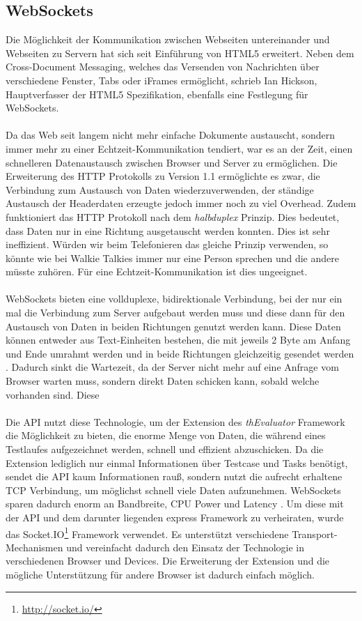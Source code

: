 \subsection{WebSockets}

Die Möglichkeit der Kommunikation zwischen Webseiten untereinander und Webseiten zu Servern hat sich seit Einführung von HTML5 erweitert. Neben dem Cross-Document Messaging, welches das Versenden von Nachrichten über verschiedene Fenster, Tabs oder iFrames ermöglicht, schrieb Ian Hickson, Hauptverfasser der HTML5 Spezifikation, ebenfalls eine Festlegung für WebSockets.\\
\\
Da das Web seit langem nicht mehr einfache Dokumente austauscht, sondern immer mehr zu einer Echtzeit-Kommunikation tendiert, war es an der Zeit, einen schnelleren Datenaustausch zwischen Browser und Server zu ermöglichen. Die Erweiterung des HTTP Protokolls zu Version 1.1 ermöglichte es zwar, die Verbindung zum Austausch von Daten wiederzuverwenden, der ständige Austausch der Headerdaten erzeugte jedoch immer noch zu viel Overhead. Zudem funktioniert das HTTP Protokoll nach dem \textit{halbduplex} Prinzip. Dies bedeutet, dass Daten nur in eine Richtung ausgetauscht werden konnten. Dies ist sehr ineffizient. Würden wir beim Telefonieren das gleiche Prinzip verwenden, so könnte wie bei Walkie Talkies immer nur eine Person sprechen und die andere müsste zuhören. Für eine Echtzeit-Kommunikation ist dies ungeeignet.\\
\\
WebSockets bieten eine vollduplexe, bidirektionale Verbindung, bei der nur ein mal die Verbindung zum Server aufgebaut werden muss und diese dann für den Austausch von Daten in beiden Richtungen genutzt werden kann. Diese Daten können entweder aus Text-Einheiten bestehen, die mit jeweils 2 Byte am Anfang und Ende umrahmt werden und in beide Richtungen gleichzeitig gesendet werden \cite{socketsbirectional}. Dadurch sinkt die Wartezeit, da der Server nicht mehr auf eine Anfrage vom Browser warten muss, sondern direkt Daten schicken kann, sobald welche vorhanden sind. Diese \\
\\
Die API nutzt diese Technologie, um der Extension des \textit{thEvaluator} Framework die Möglichkeit zu bieten, die enorme Menge von Daten, die während eines Testlaufes aufgezeichnet werden, schnell und effizient abzuschicken. Da die Extension lediglich nur einmal Informationen über Testcase und Tasks benötigt, sendet die API kaum Informationen rauß, sondern nutzt die aufrecht erhaltene TCP Verbindung, um möglichst schnell viele Daten aufzunehmen. WebSockets sparen dadurch enorm an Bandbreite, CPU Power und Latency \cite{websockets}. Um diese mit der API und dem darunter liegenden express Framework zu verheiraten, wurde das Socket.IO\footnote{\url{http://socket.io/}} Framework verwendet. Es unterstützt verschiedene Transport-Mechanismen und vereinfacht dadurch den Einsatz der Technologie in verschiedenen Browser und Devices. Die Erweiterung der Extension und die mögliche Unterstützung für andere Browser ist dadurch einfach möglich.\\

